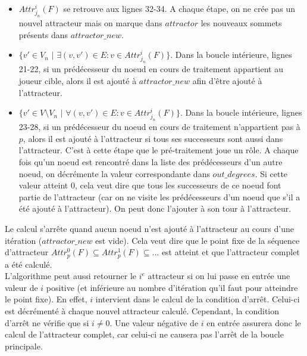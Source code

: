 \documentclass[12pt,a4paper,oneside,titlepage]{report}
\begin{document}
\begin{itemize}
\item $Attr^i_{j_n}(F)$ se retrouve aux lignes 32-34. A chaque étape, on ne crée pas un nouvel attracteur mais on marque dans $attractor$ les nouveaux sommets présents dans $attractor\_new$.
\item $\{v'\in V_n$ $|$ $\exists(v,v')\in E:v\in Attr^i_{j_n}(F)\}$. Dans la boucle intérieure, lignes 21-22, si un prédécesseur du noeud en cours de traitement appartient au joueur cible, alors il est ajouté à $attractor\_new$ afin d'être ajouté à l'attracteur.
\item $\{v'\in V\setminus V_n$ $|$ $\forall(v,v')\in E:v\in Attr^i_{j_n}(F)\}$. Dans la boucle intérieure, lignes 23-28, si un prédécesseur du noeud en cours de traitement n'appartient pas à $p$, alors il est ajouté à l'attracteur si tous ses successeurs sont aussi dans l'attracteur. C'est à cette étape que le pré-traitement joue un rôle. A chaque fois qu'un noeud est rencontré dans la liste des prédécesseurs d'un autre noeud, on décrémente la valeur correspondante dans $out\_degrees$. Si cette valeur atteint $0$, cela veut dire que tous les successeurs de ce noeud font partie de l'attracteur (car on ne visite les prédécesseurs d'un noeud que s'il a été ajouté à l'attracteur). On peut donc l'ajouter à son tour à l'attracteur.
\end{itemize}
Le calcul s'arrête quand aucun noeud n'est ajouté à l'attracteur au cours d'une itération ($attractor\_new$ est vide). Cela veut dire que le point fixe de la séquence d'attracteur $Attr^0_p(F)\subseteq Attr^1_p(F)\subseteq ...$ est atteint et que l'attracteur complet a été calculé.\\
L'algorithme peut aussi retourner le $i^e$ attracteur si on lui passe en entrée une valeur de $i$ positive (et inférieure au nombre d'itération qu'il faut pour atteindre le point fixe). En effet, $i$ intervient dans le calcul de la condition d'arrêt. Celui-ci est décrémenté à chaque nouvel attracteur calculé. Cependant, la condition d'arrêt ne vérifie que si $i\neq 0$. Une valeur négative de $i$ en entrée assurera donc le calcul de l'attracteur complet, car celui-ci ne causera pas l'arrêt de la boucle principale.
\end{document}
